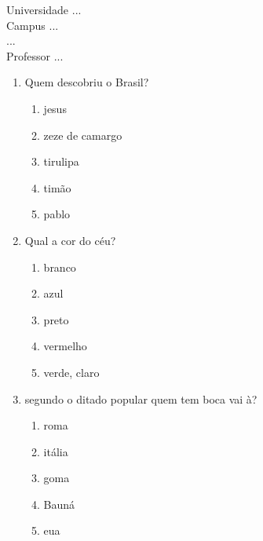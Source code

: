 \documentclass[10pt,a4paper,twocolumn]{report}
\begin{document}
\begin{flushleft}
Universidade ...\\
Campus ...\\
...\\
Professor ...\\
\end{flushleft}




 \begin{enumerate} 
    \item  Quem descobriu o Brasil?





    \begin{enumerate}
    \item  jesus

\item  zeze de camargo

\item  tirulipa

\item  timão

\item  pablo


    \end{enumerate} 
    \item  Qual a cor do céu?





    \begin{enumerate}
    \item  branco

\item  azul

\item  preto

\item  vermelho

\item  verde, claro


    \end{enumerate} 
    \item  segundo o ditado popular quem tem boca vai à?





    \begin{enumerate}
    \item  roma

\item  itália

\item  goma

\item  Bauná

\item  eua


    \end{enumerate}\end{enumerate} 
\end{document}
